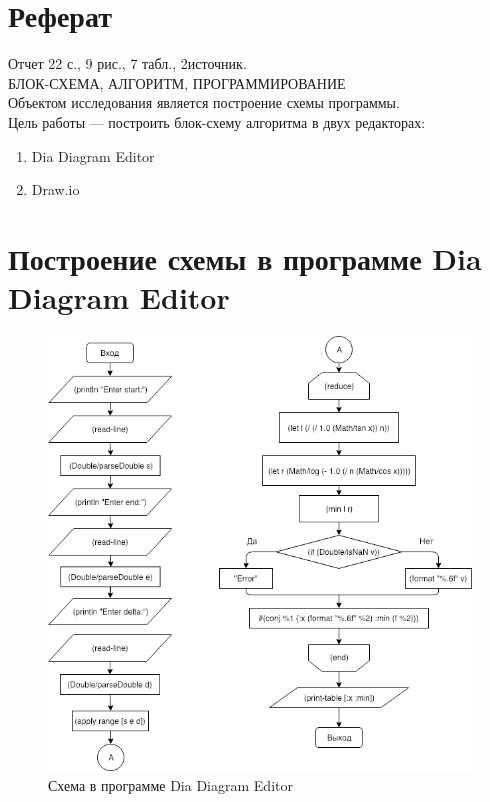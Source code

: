 \documentclass[a4paper,14pt,russian]{report}
\begin{document}


\newpage
{}
\setcounter{page}{2}

\section*{Реферат}

\noindent Отчет 22 с., 9 рис., 7 табл., 2источник. \\
БЛОК-СХЕМА, АЛГОРИТМ, ПРОГРАММИРОВАНИЕ \\
Объектом исследования является построение схемы программы. \\
Цель работы — построить блок-схему алгоритма в двух редакторах:
\begin{enumerate}
  \item Dia Diagram Editor
  \item Draw.io
\end{enumerate}

\tableofcontents

\section{Построение схемы в программе Dia Diagram Editor}

\begin{figure}[!htb]
  \centerline{\includegraphics[width=1\textwidth]{dia}}
  \caption{Схема в программе Dia Diagram Editor}
\end{figure}
\end{document}
